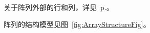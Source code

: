 \documentclass[dvipsnames]{article}%
\begin{document}
\begin{enumerate}
关于阵列外部的行和列，详见~p.\pageref{zm:ExteriorRowAndColumn}。

阵列的结构模型见图~\ref{fig:ArrayStructureFig}。

\begin{figure}[H]
\centering
%
%
%
%
%
%
%

\end{figure}
\end{enumerate}
\end{document}
